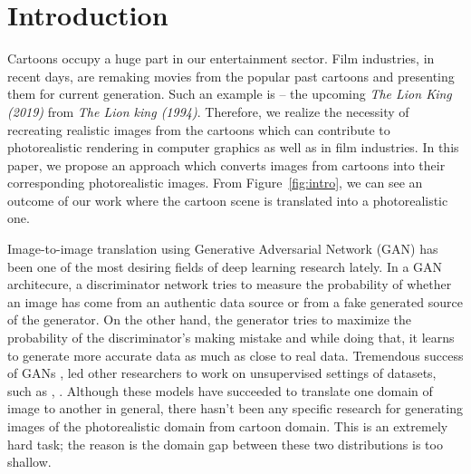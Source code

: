 \documentclass[runningheads]{llncs}
\begin{document}
\section{Introduction}
Cartoons occupy a huge part in our entertainment sector.
Film industries, in recent days, are remaking movies from the popular past cartoons and presenting them for current generation. Such an example is --
the upcoming \textit{The Lion King (2019)} from \textit{The Lion king (1994)}. %
Therefore, we realize the necessity of recreating realistic images from the cartoons which can contribute to photorealistic rendering in computer graphics as well as in film industries. 
In this paper, we propose an approach which converts images from cartoons into their corresponding photorealistic images. From Figure~\ref{fig:intro}, we can see an outcome of our work where the cartoon scene is translated into a photorealistic one.

Image-to-image translation using Generative Adversarial Network (GAN)\cite{DBLP:conf/nips/GoodfellowPMXWOCB14} has been one of the most desiring fields of deep learning research lately. In a GAN architecure, a discriminator network tries to measure the probability of whether an image has come from an authentic data source or from a fake generated source of the generator. On the other hand, the generator tries to maximize the probability of the discriminator's making mistake and while doing that, it learns to generate more accurate data as much as close to real data. 
Tremendous
success of GANs \cite{DBLP:conf/nips/GoodfellowPMXWOCB14}, led other researchers to work on unsupervised settings of datasets, such as \cite{DBLP:conf/iccv/ZhuPIE17}, \cite{DBLP:conf/icml/KimCKLK17}. Although these models have succeeded to translate one domain of image to another in general, there hasn't been any specific research for generating images of the photorealistic domain from cartoon domain.
This is an extremely hard task; the reason is the domain gap between these two distributions is too shallow.
\end{document}
